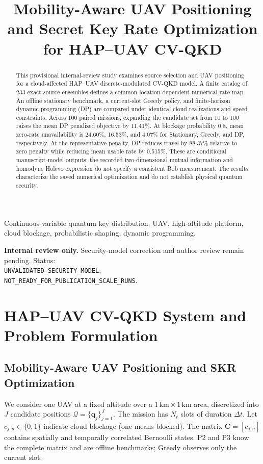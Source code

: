 \documentclass[conference,a4paper]{IEEEtran}
\title{Mobility-Aware UAV Positioning and Secret Key Rate Optimization for HAP--UAV CV-QKD}
\author{\IEEEauthorblockN{TBD\IEEEauthorrefmark{1},
TBD\IEEEauthorrefmark{2}}
\IEEEauthorblockA{\IEEEauthorrefmark{1}XXX}
\IEEEauthorblockA{\IEEEauthorrefmark{2}Computer Communications Laboratory,
The University of Aizu, Aizuwakamatsu 965-8580, Japan}}
\begin{document}
\maketitle
\begin{abstract}
This provisional internal-review study examines source selection and UAV positioning for a cloud-affected HAP--UAV discrete-modulated CV-QKD model. A finite catalog of 233 exact-source ensembles defines a common location-dependent numerical rate map. An offline stationary benchmark, a current-slot Greedy policy, and finite-horizon dynamic programming (DP) are compared under identical cloud realizations and speed constraints. Across 100 paired missions, expanding the candidate set from 10 to 100 raises the mean DP penalized objective by 11.41\%. At blockage probability 0.8, mean zero-rate unavailability is 24.60\%, 16.53\%, and 4.07\% for Stationary, Greedy, and DP, respectively. At the representative penalty, DP reduces travel by 88.37\% relative to zero penalty while reducing mean usable rate by 0.515\%. These are conditional manuscript-model outputs: the recorded two-dimensional mutual information and homodyne Holevo expression do not specify a consistent Bob measurement. The results characterize the saved numerical optimization and do not establish physical quantum security.
\end{abstract}
\begin{IEEEkeywords}
Continuous-variable quantum key distribution, UAV, high-altitude platform, cloud blockage, probabilistic shaping, dynamic programming.
\end{IEEEkeywords}
\noindent\textbf{Internal review only.} Security-model correction and author review remain pending. Status:\\
{\footnotesize\texttt{UNVALIDATED\_SECURITY\_MODEL};}\\
{\footnotesize\texttt{NOT\_READY\_FOR\_PUBLICATION\_SCALE\_RUNS}.}
\section{HAP--UAV CV-QKD System and Problem Formulation}
\label{sec:system}
\subsection{Mobility-Aware UAV Positioning and SKR Optimization}
We consider one UAV at a fixed altitude over a $1\,\mathrm{km}\times
1\,\mathrm{km}$ area, discretized into $J$ candidate positions
$\mathcal Q=\{\mathbf q_j\}_{j=1}^J$. The mission has $N_t$ slots of
duration $\Delta t$. Let $c_{j,n}\in\{0,1\}$ indicate cloud blockage
(one means blocked). The matrix $\mathbf C=[c_{j,n}]$ contains spatially
and temporally correlated Bernoulli states. P2 and P3 know the complete
matrix and are offline benchmarks; Greedy observes only the current slot.
\end{document}

